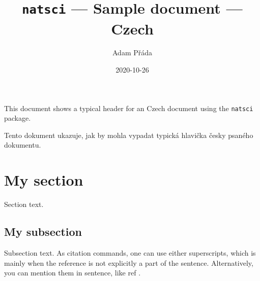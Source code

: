 \documentclass[11pt]{article}
\title{\texttt{natsci} --- Sample document --- Czech}
\author{Adam Přáda}
\date{2020-10-26}
\begin{document}
    \pagestyle{fancy}
    \maketitle
    This document shows a typical header for an Czech document using the \texttt{natsci} package.
    
    Tento dokument ukazuje, jak by mohla vypadat typická hlavička česky psaného dokumentu.
    
    \section{My section}
    Section text.
    \subsection{My subsection}
    Subsection text.
    \newpage
    As citation commands, one can use either superscripts, which is mainly when the reference is not explicitly a part of the sentence.\supercite{cit1} Alternatively, you can mention them in sentence, like ref \cite{cit2}.
    \printbibliography
\end{document}
